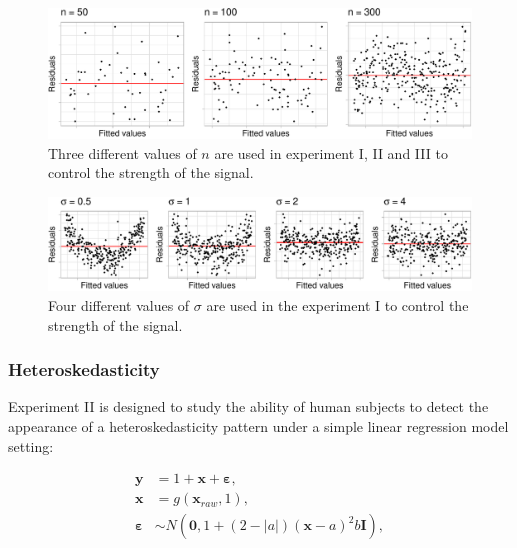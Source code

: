 \documentclass[]{interact}
\theoremstyle{plain}%
\theoremstyle{definition}
\theoremstyle{remark}
\begin{document}
\begin{figure}

{\centering \includegraphics[width=1\linewidth]{paper_comparison_files/figure-latex/different-n-1} 

}

\caption{Three different values of $n$ are used in experiment I, II and III to control the strength of the signal.}\label{fig:different-n}
\end{figure}

\begin{figure}

{\centering \includegraphics[width=1\linewidth]{paper_comparison_files/figure-latex/different-sigma-1} 

}

\caption{Four different values of $\sigma$ are used in the experiment I to control the strength of the signal.}\label{fig:different-sigma}
\end{figure}

\hypertarget{heteroskedasticity}{%
\subsubsection{Heteroskedasticity}\label{heteroskedasticity}}

Experiment II is designed to study the ability of human subjects to
detect the appearance of a heteroskedasticity pattern under a simple
linear regression model setting:

\begin{align} \label{eq:heter-model}
\boldsymbol{y} &= 1 + \boldsymbol{x} + \boldsymbol{\varepsilon},\\
\boldsymbol{x} &= g(\boldsymbol{x}_{raw}, 1),\\
\boldsymbol{\varepsilon} &\sim N(\boldsymbol{0}, 1 + (2 - |a|)(\boldsymbol{x} - a)^2b \boldsymbol{I}), 
\end{align}
\end{document}
